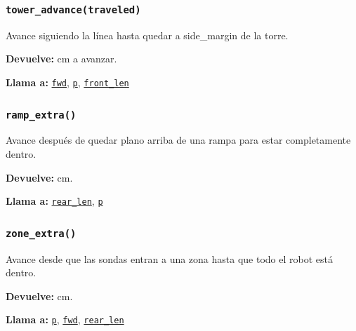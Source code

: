 \subsubsection{\texttt{tower\_\allowbreak{}advance(traveled)}}\label{fn:geometry:tower-advance}
\noindent Avance siguiendo la línea hasta quedar a side\_margin de la torre.

\par{}\par\smallskip
\noindent\textbf{Devuelve:} cm a avanzar.\par
\noindent\textbf{Llama a:} \hyperref[fn:geometry:fwd]{\texttt{fwd}}, \hyperref[fn:geometry:p]{\texttt{p}}, \hyperref[fn:geometry:front-len]{\texttt{front\_\allowbreak{}len}}\par

\subsubsection{\texttt{ramp\_\allowbreak{}extra()}}\label{fn:geometry:ramp-extra}
\noindent Avance después de quedar plano arriba de una rampa para estar completamente dentro.

\noindent\textbf{Devuelve:} cm.\par
\noindent\textbf{Llama a:} \hyperref[fn:geometry:rear-len]{\texttt{rear\_\allowbreak{}len}}, \hyperref[fn:geometry:p]{\texttt{p}}\par

\subsubsection{\texttt{zone\_\allowbreak{}extra()}}\label{fn:geometry:zone-extra}
\noindent Avance desde que las sondas entran a una zona hasta que todo el robot está dentro.

\noindent\textbf{Devuelve:} cm.\par
\noindent\textbf{Llama a:} \hyperref[fn:geometry:p]{\texttt{p}}, \hyperref[fn:geometry:fwd]{\texttt{fwd}}, \hyperref[fn:geometry:rear-len]{\texttt{rear\_\allowbreak{}len}}\par

